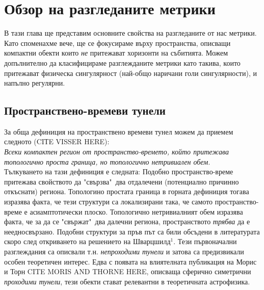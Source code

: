 \section{Обзор на разгледаните метрики}
В тази глава ще представим основните свойства на разгледаните от нас метрики. Като споменахме вече, ще се фокусираме върху пространства, описващи компактни обекти които \emph{не} притежават хоризонти на събитията. Можем допълнително да класифицираме разглежданите метрики като такива, които притежават физическа сингулярност (най-общо наричани голи сингулярности), и напълно регулярни.
 
\subsection{Пространствено-времеви тунели}
За обща дефиниция на пространствено времеви тунел можем да приемем следното (CIТE VISSER HERE):\\

\emph{Всеки компактен регион от пространство-времето, който притежава топологично проста граница, но топологично нетривиален обем.}\\\newline
Тълкуването на тази дефиниция е следната: Подобно пространство-време притежава свойството да "свързва"$\,$ два отдалечени (потенциално причинно откъснати) региона. Топологино простата граница в горната дефиниция тогава изразява факта, че тези структури са локализирани така, че самото пространство-време е асиамптотически плоско. Топологично нетривиалният обем изразява факта, че за да се "свържат"$\,$ два далечни региона, пространството \emph{трябва} да е неедносвързано. Подобни структури за пръв път са били обсъдени в литературата скоро след откриването на решението на Шварцшилд$^1$. Тези първоначални разглеждания са описвали т.н. \emph{непроходими тунели} и затова са предизвикали особен теоретичен интерес. Едва с появата на влиятелната публикация на Морис и Торн CITE MORIS AND THORNE HERE, описваща сферично симетрични \emph{проходими тунели}, тези обекти стават релевантни в теоретичната астрофизика.\\

